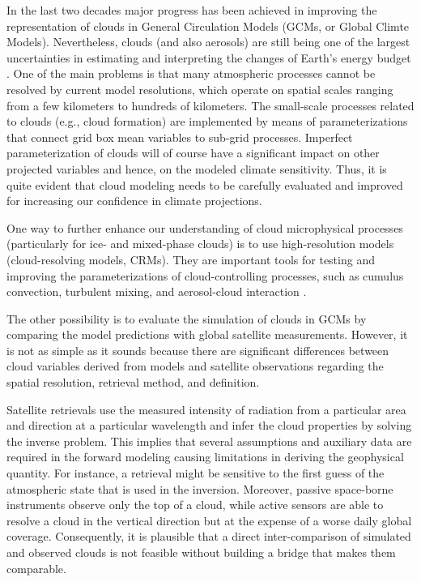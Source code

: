 
In the last two decades major progress has been achieved in improving the representation 
of clouds in General Circulation Models (GCMs, or Global Climte Models). 
Nevertheless, clouds (and also aerosols) are still being one of the largest uncertainties 
in estimating and interpreting the changes of Earth's energy budget \cite{IPCC2013}. 
One of the main problems is that many atmospheric processes cannot be resolved by current model resolutions, 
which operate on spatial scales ranging from a few kilometers to hundreds of kilometers. 
The small-scale processes related to clouds (e.g., cloud formation) 
are implemented by means of parameterizations that connect grid box mean variables to sub-grid processes.
Imperfect parameterization of clouds will of course have a significant impact on other projected variables 
and hence, on the modeled climate sensitivity. 
Thus, it is quite evident that cloud modeling needs to be carefully evaluated and improved 
for increasing our confidence in climate projections.

One way to further enhance our understanding of cloud microphysical processes 
(particularly for ice- and mixed-phase clouds) is to use high-resolution models (cloud-resolving models, CRMs).
They are important tools for testing and improving the parameterizations of cloud-controlling processes,
such as cumulus convection, turbulent mixing, and aerosol-cloud interaction \cite{IPCC2013}.

The other possibility is to evaluate the simulation of clouds in GCMs by comparing
the model predictions with global satellite measurements.
However, it is not as simple as it sounds because there are significant differences
between cloud variables derived from models and satellite observations regarding
the spatial resolution, retrieval method, and definition.

Satellite retrievals use the measured intensity of radiation
from a particular area and direction at a particular wavelength and 
infer the cloud properties by solving the inverse problem.
This implies that several assumptions and auxiliary data are required in the forward modeling
causing limitations in deriving the geophysical quantity. For instance,
a retrieval might be sensitive to the first guess of the atmospheric state that is used in the inversion.
Moreover, passive space-borne instruments observe only the top of a cloud, while active sensors 
are able to resolve a cloud in the vertical direction but at the expense of a worse daily global coverage.
Consequently, it is plausible that a direct inter-comparison of simulated and observed clouds 
is not feasible without building a bridge that makes them comparable.

